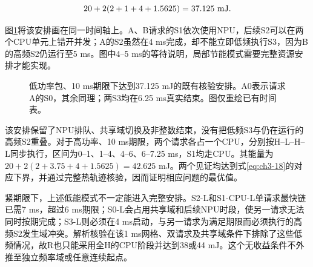 \begin{equation}
20+2(2+1+4+1.5625)=37.125\ {\rm mJ}.
\label{eq:ch3-21}
\end{equation}

图\ref{fig:response-witness}将该安排画在同一时间轴上。A、B请求的S1依次使用NPU，后续S2可以在两个CPU单元上错开并发；A的S2虽然在4 ms完成，却不能立即低频执行S3，因为B的高频S2仍运行至5 ms。图中4--5 ms的等待说明，局部节能模式需要完整资源安排才能实现。

\begin{figure}[htbp]
\centering
{}
\caption{低功率包、10 ms期限下达到37.125 mJ的既有核验安排。A0表示请求A的S0，其余同理；两S3均在6.25 ms真实结束。图仅重绘已有时间表。}
\label{fig:response-witness}
\end{figure}

该安排保留了NPU排队、共享域切换及非整数结束，没有把低频S3与仍在运行的高频S2重叠。对于高功率、10 ms期限，两个请求各占一个CPU，分别按H--L--H--L同步执行，区间为0--1、1--4、4--6、6--7.25 ms，S1均走CPU。其能量为\(20+2(2+3.75+4+1.5625)=42.625\) mJ。两个见证均达到式\eqref{eq:ch3-18}的对应下界，并通过完整热轨迹核验，因而证明相应问题的最优值。

紧期限下，上述低能模式不一定能进入完整安排。S2-L和S1-CPU-L单请求最快链已需7 ms，超过6 ms期限；S0-L会占用共享域和后续NPU时段，使另一请求无法同时按期完成；S3-L则必须在4 ms启动，与另一请求为满足期限而必须执行的高频S2发生域冲突。解析核验在该1 ms网格、双请求及共享域条件下排除了这些低频情况，故R也只能采用全H的CPU阶段并达到38或44 mJ。这个无收益条件不外推至独立频率域或任意连续起点。

